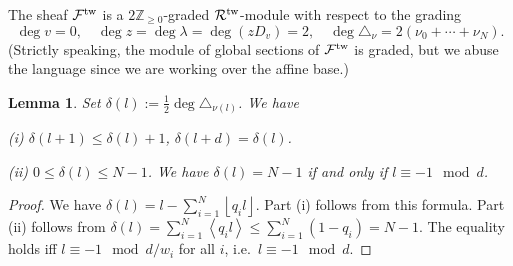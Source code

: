 \documentclass[11pt]{amsart}
\newtheorem{lem}[thm]{Lemma} %
\theoremstyle{definition} %
\theoremstyle{remark} %
\newcommand{\CC}{\mathbb C}
\newcommand{\PP}{\mathbb P}
\newcommand{\ZZ}{\mathbb Z}
\newcommand{\tw}{{\rm tw}}
\def\fracp#1{\left\langle #1 \right\rangle}
\def\floor#1{\left\lfloor #1 \right\rfloor}
\newcommand{\cMo}{\mathcal{M}^\circ}
\newcommand{\cF}{\mathcal{F}}
\newcommand{\cR}{\mathcal{R}}
\newcommand{\sfp}{\mathsf{p}}
\newcommand{\vc}{v_{\rm c}}
\newcommand{\uw}{\underline{w}}
\begin{document}
The sheaf $\cF^\tw$ is a $2\ZZ_{\ge 0}$-graded 
$\cR^\tw$-module with respect to the grading 
\[
\deg v =0, \quad 
\deg z = \deg \lambda = \deg (zD_v) =2, \quad 
\deg \triangle_\nu = 2(\nu_0 + \cdots + \nu_N). 
\]
(Strictly speaking, the module of global sections of $\cF^\tw$ 
is graded, but we abuse the language since we are working over 
the affine base.) 


\begin{lem} 
\label{lem:degDelta} 
Set $\delta(l) := \frac{1}{2} \deg \triangle_{\nu(l)}$. 
We have 

{\rm (i)} $\delta(l+1) \le \delta(l) +1$, $\delta(l+d) = \delta(l)$. 

{\rm (ii)} $ 0\le \delta(l) \le N-1$. 
We have 
$\delta(l)=N-1$ if and only if $l\equiv -1 \mod d$. 
\end{lem} 
\begin{proof} 
We have $\delta(l) = l - \sum_{i=1}^N \floor{q_i l}$. 
Part (i) follows from this formula. 
Part (ii) follows from $\delta(l) =  
\sum_{i=1}^N \fracp{q_i l} \le \sum_{i=1}^N (1-q_i) = N-1$. 
The equality holds iff $l \equiv -1 \mod d/w_i$ for all $i$, 
i.e.\ $l\equiv -1 \mod d$. 
\end{proof} 
\end{document}
